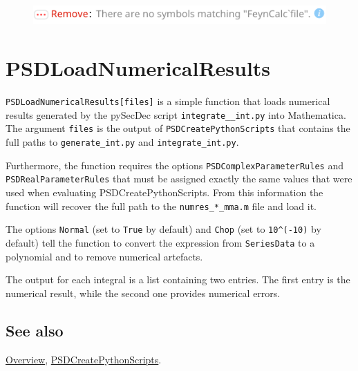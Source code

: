 \documentclass[../FeynHelpersManual.tex]{subfiles}
\begin{document}
\FloatBarrier
\begin{figure}[!ht]
\centering
\includegraphics[width=0.6\linewidth]{img/1ftg3ucp91fwc.pdf}
\end{figure}
\FloatBarrier

\begin{Shaded}
\begin{Highlighting}[]
 
\end{Highlighting}
\end{Shaded}

\hypertarget{psdloadnumericalresults}{
\section{PSDLoadNumericalResults}\label{psdloadnumericalresults}}

\texttt{PSDLoadNumericalResults[\allowbreak{}files]} is a simple
function that loads numerical results generated by the pySecDec script
\texttt{integrate__int.py} into Mathematica. The argument \texttt{files}
is the output of \texttt{PSDCreatePythonScripts} that contains the full
paths to \texttt{generate_int.py} and \texttt{integrate_int.py}.

Furthermore, the function requires the options
\texttt{PSDComplexParameterRules} and \texttt{PSDRealParameterRules}
that must be assigned exactly the same values that were used when
evaluating PSDCreatePythonScripts. From this information the function
will recover the full path to the \texttt{numres_*_mma.m} file and load
it.

The options \texttt{Normal} (set to \texttt{True} by default) and
\texttt{Chop} (set to \texttt{10^(-10)} by default) tell the function to
convert the expression from \texttt{SeriesData} to a polynomial and to
remove numerical artefacts.

The output for each integral is a list containing two entries. The first
entry is the numerical result, while the second one provides numerical
errors.

\subsection{See also}

\hyperlink{toc}{Overview},
\hyperlink{psdcreatepythonscripts}{PSDCreatePythonScripts}.
\end{document}
